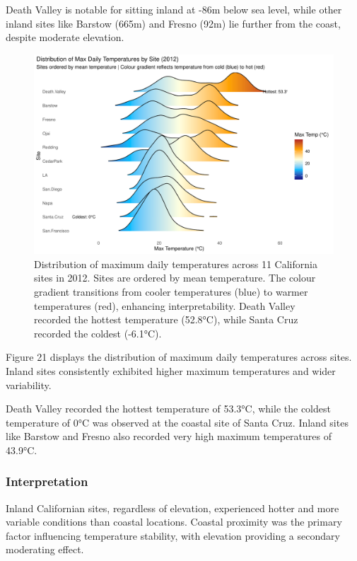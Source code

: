 \documentclass[
  11pt,
]{article}
\begin{document}
Death Valley is notable for sitting inland at -86m below sea level,
while other inland sites like Barstow (665m) and Fresno (92m) lie
further from the coast, despite moderate elevation.

\begin{figure}[H]

{\centering \includegraphics{project_files/figure-pdf/ca_temp_ridgeline-1.pdf}

}

\caption{Distribution of maximum daily temperatures across 11 California
sites in 2012. Sites are ordered by mean temperature. The colour
gradient transitions from cooler temperatures (blue) to warmer
temperatures (red), enhancing interpretability. Death Valley recorded
the hottest temperature (52.8°C), while Santa Cruz recorded the coldest
(-6.1°C).}

\end{figure}%

Figure 21 displays the distribution of maximum daily temperatures across
sites. Inland sites consistently exhibited higher maximum temperatures
and wider variability.

Death Valley recorded the hottest temperature of 53.3°C, while the
coldest temperature of 0°C was observed at the coastal site of Santa
Cruz. Inland sites like Barstow and Fresno also recorded very high
maximum temperatures of 43.9°C.

\subsubsection{Interpretation}\label{interpretation-2}

Inland Californian sites, regardless of elevation, experienced hotter
and more variable conditions than coastal locations. Coastal proximity
was the primary factor influencing temperature stability, with elevation
providing a secondary moderating effect.
\end{document}
